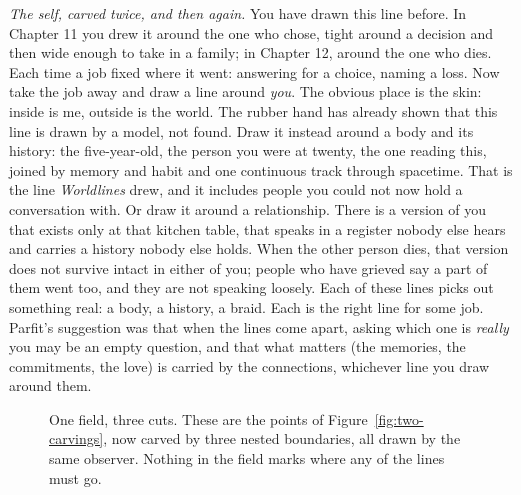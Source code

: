 \emph{The self, carved twice, and then again.} You have drawn this line before. In Chapter 11 you drew it around the one who chose, tight around a decision and then wide enough to take in a family; in Chapter 12, around the one who dies. Each time a job fixed where it went: answering for a choice, naming a loss. Now take the job away and draw a line around \emph{you}. The obvious place is the skin: inside is me, outside is the world. The rubber hand has already shown that this line is drawn by a model, not found. Draw it instead around a body and its history: the five-year-old, the person you were at twenty, the one reading this, joined by memory and habit and one continuous track through spacetime. That is the line \textit{Worldlines} drew, and it includes people you could not now hold a conversation with. Or draw it around a relationship. There is a version of you that exists only at that kitchen table, that speaks in a register nobody else hears and carries a history nobody else holds. When the other person dies, that version does not survive intact in either of you; people who have grieved say a part of them went too, and they are not speaking loosely. Each of these lines picks out something real: a body, a history, a braid. Each is the right line for some job. Parfit's suggestion was that when the lines come apart, asking which one is \emph{really} you may be an empty question, and that what matters (the memories, the commitments, the love) is carried by the connections, whichever line you draw around them.

\begin{figure}[h]
\centering
{}
\caption{One field, three cuts. These are the points of Figure~\ref{fig:two-carvings}, now carved by three nested boundaries, all drawn by the same observer. Nothing in the field marks where any of the lines must go.}
\label{fig:three-cuts}
\end{figure}

